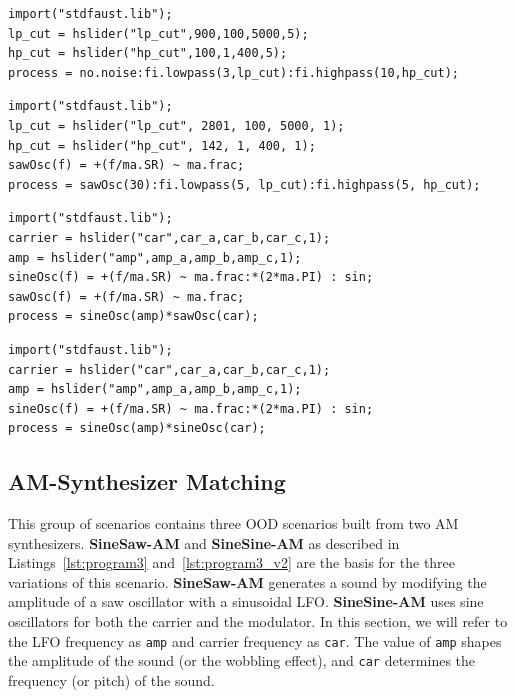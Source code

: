\documentclass[10pt]{article} %
\newcommand{\BPNoise}{\textbf{BP-Noise}\xspace}
\newcommand{\BPSaw}{\textbf{BP-Saw}\xspace}
\newcommand{\FMMod}{\textbf{SineSaw-AM}\xspace}
\newcommand{\FMModvtwo}{\textbf{SineSine-AM}\xspace}
\begin{document}
\begin{lstlisting}[caption={\BPNoise}, label={lst:program0}, language=Faust,
                  float, floatplacement=!H, xleftmargin=1em, xrightmargin=0.5em, firstnumber=0, aboveskip=0em, belowskip=-1em]
import("stdfaust.lib");
lp_cut = hslider("lp_cut",900,100,5000,5);
hp_cut = hslider("hp_cut",100,1,400,5);
process = no.noise:fi.lowpass(3,lp_cut):fi.highpass(10,hp_cut);
\end{lstlisting}

\begin{lstlisting}[caption={\BPSaw}, label={lst:program0_saw}, language=Faust,
                  float, floatplacement=!H, xleftmargin=1em, xrightmargin=0.5em, firstnumber=0, aboveskip=0em, belowskip=-1em]
import("stdfaust.lib");
lp_cut = hslider("lp_cut", 2801, 100, 5000, 1);
hp_cut = hslider("hp_cut", 142, 1, 400, 1);
sawOsc(f) = +(f/ma.SR) ~ ma.frac;
process = sawOsc(30):fi.lowpass(5, lp_cut):fi.highpass(5, hp_cut);
\end{lstlisting}

\begin{lstlisting}[caption={\FMMod}, label={lst:program3},language=Faust,float,floatplacement=!H,xleftmargin=1em,xrightmargin=0.5em,firstnumber=0,aboveskip=0em, belowskip=-1em]
import("stdfaust.lib");
carrier = hslider("car",car_a,car_b,car_c,1);
amp = hslider("amp",amp_a,amp_b,amp_c,1);
sineOsc(f) = +(f/ma.SR) ~ ma.frac:*(2*ma.PI) : sin;
sawOsc(f) = +(f/ma.SR) ~ ma.frac;
process = sineOsc(amp)*sawOsc(car);
\end{lstlisting}


\begin{lstlisting}[caption={\FMModvtwo}, label={lst:program3_v2},language=Faust,float,floatplacement=!H,xleftmargin=1em,xrightmargin=0.5em,firstnumber=0,aboveskip=0em, belowskip=-1em]
import("stdfaust.lib");
carrier = hslider("car",car_a,car_b,car_c,1);
amp = hslider("amp",amp_a,amp_b,amp_c,1);
sineOsc(f) = +(f/ma.SR) ~ ma.frac:*(2*ma.PI) : sin;
process = sineOsc(amp)*sineOsc(car);
\end{lstlisting}



\subsection{AM-Synthesizer Matching}
\label{sec:am_sound_matching}

 This group of scenarios contains three OOD scenarios built from two AM synthesizers.  \FMMod and \FMModvtwo as described in Listings~\ref{lst:program3} and~\ref{lst:program3_v2} are the basis for the three variations of this scenario. \FMMod generates a sound by modifying the amplitude of a saw oscillator with a sinusoidal LFO. \FMModvtwo uses sine oscillators for both the carrier and the modulator. In this section, we will refer to the LFO frequency as \texttt{amp} and carrier frequency as \texttt{car}. The value of \texttt{amp} shapes the amplitude of the sound (or the wobbling effect), and \texttt{car} determines the frequency (or pitch) of the sound.
\end{document}
